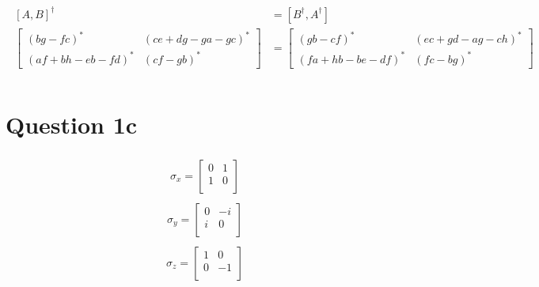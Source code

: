 \documentclass{article}
\begin{document}
\begin{align*}
    \begin{split}
        [A, B]^{\dagger} &= [B^{\dagger}, A^{\dagger}] \\
        \begin{bmatrix} 
            (bg - fc)^* &  (ce + dg - ga - gc)^* \\
            (af + bh - eb - fd)^* & (cf - gb)^*
        \end{bmatrix} &= \begin{bmatrix}
            (gb - cf)^* & (ec + gd - ag - ch)^* \\
            (fa + hb - be - df)^* & (fc - bg)^*
        \end{bmatrix} \\
    \end{split}
\end{align*}

\section*{Question 1c}
\begin{align*}
    \begin{split}
        \sigma_x =
        \begin{bmatrix}
            0 & 1 \\
            1 & 0 \\
        \end{bmatrix}
    \end{split}
\end{align*}
\begin{align*}
    \begin{split}
        \sigma_y =
        \begin{bmatrix}
            0 & -i \\
            i & 0 \\
        \end{bmatrix}
    \end{split}
\end{align*}
\begin{align*}
    \begin{split}
        \sigma_z =
        \begin{bmatrix}
            1 & 0 \\
            0 & -1 \\
        \end{bmatrix}
    \end{split}
\end{align*}
\end{document}
